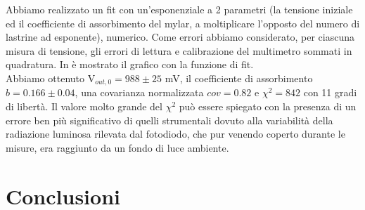 Abbiamo realizzato un fit con un'esponenziale a 2 parametri (la tensione iniziale ed il coefficiente di assorbimento del mylar, a moltiplicare l'opposto del numero di lastrine ad esponente), numerico. Come errori abbiamo considerato, per ciascuna misura di tensione, gli errori di lettura e calibrazione del multimetro sommati in quadratura. In  è mostrato il grafico con la funzione di fit.\\
Abbiamo ottenuto V$_{out,0} = 988 \pm 25$ mV, il coefficiente di assorbimento $b = 0.166 \pm 0.04$, una covarianza normalizzata $cov = 0.82$ e $\chi^2 = 842$ con 11 gradi di libertà. Il valore molto grande del $\chi^2$ può essere spiegato con la presenza di un errore ben più significativo di quelli strumentali dovuto alla variabilità della radiazione luminosa rilevata dal fotodiodo, che pur venendo coperto durante le misure, era raggiunto da un fondo di luce ambiente.

\section{Conclusioni}


